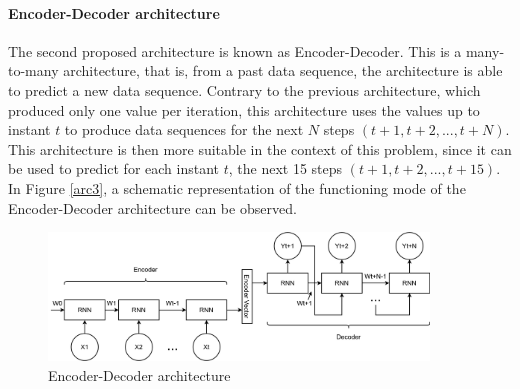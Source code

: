 \paragraph*{Encoder-Decoder architecture}

The second proposed architecture is known as Encoder-Decoder. This is a many-to-many architecture, that is, from a past data sequence, the architecture is able to predict a new data sequence. Contrary to the previous architecture, which produced only one value per iteration, this architecture uses the values up to instant $t$ to produce data sequences for the next $N$ steps $(t+1, t+2, ..., t+N)$. This architecture is then more suitable in the context of this problem, since it can be used to predict for each instant $t$, the next 15 steps $(t+1, t+2, ..., t+15)$. In Figure \ref{arc3}, a schematic representation of the functioning mode of the Encoder-Decoder architecture can be observed. 

\begin{figure}[h!]
    \centering
    \begin{center}
    \includegraphics[width=0.9\textwidth]{Images/arc2.png}
    \caption{Encoder-Decoder architecture}
    \label{arc2}
    \end{center}
\end{figure}

